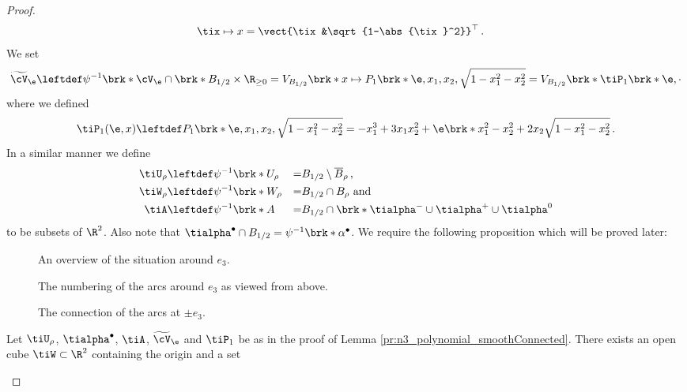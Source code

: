 \begin{proof}
\begin{align*}
    \tix&\mapsto x=\vect{\tix&\sqrt{1-\abs{\tix}^2}}^\top\,.
  \end{align*}
  We set
  \begin{align*}
    \widetilde{\cV}_\e\leftdef\psi^{-1}\brk*{\cV_\e\cap \brk*{B_{1/2}\times\R_{\geq0}}}
    =V_{B_{1/2}}\brk*{x\mapsto P_1\brk*{\e,x_1,x_2,\sqrt{1-x_1^2-x_2^2}}}
    =V_{B_{1/2}}\brk*{\tiP_1\brk*{\e,\cdot}}
  \end{align*}
  where we defined
  \begin{align*}
    \tiP_1(\e,x)\leftdef P_1\brk*{\e,x_1,x_2,\sqrt{1-x_1^2-x_2^2}}
    =-x_1^3+3x_1x_2^2+\e\brk*{x_1^2-x_2^2+2x_2\sqrt{1-x_1^2-x_2^2}}\,.
  \end{align*}
  In a similar manner we define 
  \begin{alignat*}{3}
    \tiU_\rho&\leftdef\psi^{-1}\brk*{U_\rho}&=& B_{1/2}\setminus \overline{B}_\rho\,, \\
    \tiW_\rho&\leftdef\psi^{-1}\brk*{W_\rho}&=& B_{1/2}\cap B_{\rho}\text{ and} \\
    \tiA&\leftdef\psi^{-1}\brk*{A}&=&B_{1/2}\cap\brk*{\tialpha^-\cup\tialpha^+\cup\tialpha^0}
  \end{alignat*}
  to be subsets of $\R^2$. Also note that $\tialpha^\bullet\cap B_{1/2}=\psi^{-1}\brk*{\alpha^\bullet}$.
  We require the following proposition which will be proved later:
  \begin{figure}[h]
    \centering
    \def\svgwidth{0.8\textwidth}
    
    \caption{An overview of the situation around $e_3$.}
    \label{fi:n3_polynomial_arcOverview}
  \end{figure}
  \begin{figure}[h]
    \centering
    
    \caption{The numbering of the arcs around $e_3$ as viewed from above.}
    \label{fi:n3_polynomial_arcNumbering}
  \end{figure}
  \begin{figure}[h]
    \centering
    
    \caption{The connection of the arcs at $\pm e_3$.}
    \label{fi:n3_polynomial_arcConnections}
  \end{figure}
  \begin{proposition}\label{pr:n3_polynomial_regularH}
    Let $\tiU_\rho$, $\tialpha^\bullet$, $\tiA$, $\widetilde{\cV}_\e$ and $\tiP_1$ be as in the proof of Lemma \ref{pr:n3_polynomial_smoothConnected}.
    There exists an open cube $\tiW\subset\R^2$ containing the origin and a set 

\end{proposition}
\end{proof}
